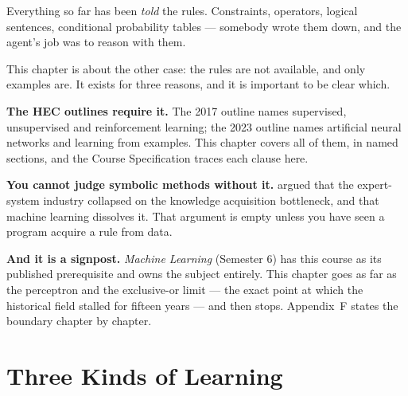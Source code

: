 Everything so far has been \emph{told} the rules. Constraints, operators, logical
sentences, conditional probability tables --- somebody wrote them down, and the
agent's job was to reason with them.

This chapter is about the other case: the rules are not available, and only examples
are. It exists for three reasons, and it is important to be clear which.

\textbf{The HEC outlines require it.} The 2017 outline names supervised,
unsupervised and reinforcement learning; the 2023 outline names artificial neural
networks and learning from examples. This chapter covers all of them, in named
sections, and the Course Specification traces each clause here.

\textbf{You cannot judge symbolic methods without it.}  argued that
the expert-system industry collapsed on the knowledge acquisition bottleneck, and
that machine learning dissolves it. That argument is empty unless you have seen a
program acquire a rule from data.

\textbf{And it is a signpost.} \emph{Machine Learning} (Semester 6) has this course
as its published prerequisite and owns the subject entirely. This chapter goes as far
as the perceptron and the exclusive-or limit --- the exact point at which the
historical field stalled for fifteen years --- and then stops. Appendix~F states the
boundary chapter by chapter.

\section{Three Kinds of Learning}

